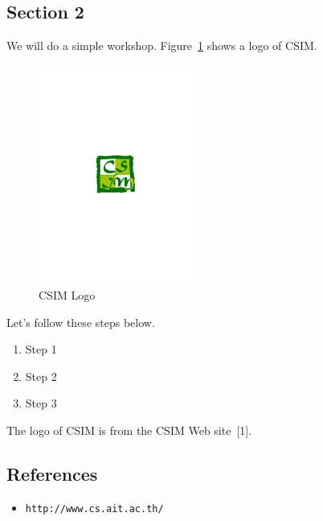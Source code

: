 \documentclass{article}
\begin{document}
\FloatBarrier

\subsection*{Section 2}

\noindent We will do a simple workshop. Figure~\ref{fig:csim-logo} shows
a logo of CSIM. \\

\begin{figure}[t]
    \centering
    \includegraphics[width=2in]{figures/csim}
    \caption{CSIM Logo}
    \label{fig:csim-logo}
\end{figure}

\noindent Let's follow these steps below.

\begin{enumerate}
    \item Step 1
    \item Step 2
    \item Step 3
\end{enumerate}

\noindent The logo of CSIM is from the CSIM Web site~[1]. \\

\subsection*{References}

\begin{itemize}
  \item[1] \tt{http://www.cs.ait.ac.th/}
\end{itemize}
\end{document}
